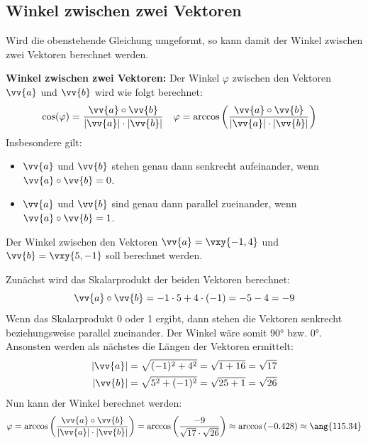 \newpage
\subsection{Winkel zwischen zwei Vektoren}
Wird die obenstehende Gleichung umgeformt, so kann damit der Winkel zwischen
zwei Vektoren berechnet werden.
\begin{theorem}
  \textbf{Winkel zwischen zwei Vektoren:} Der Winkel $\varphi$ zwischen den
  Vektoren $\vv{a}$ und $\vv{b}$ wird
  wie folgt berechnet:
  \begin{align*}
    \cos(\varphi) &= \frac{\vv{a}\circ \vv{b}}{|\vv{a}|\cdot |\vv{b}|} &
    \varphi &= \arccos\left(\frac{\vv{a}\circ \vv{b}}{|\vv{a}|\cdot |\vv{b}|}\right)
  \end{align*}
  Insbesondere gilt:
  \begin{itemize}
    \item $\vv{a}$ und $\vv{b}$ stehen genau dann senkrecht aufeinander, wenn $\vv{a}\circ \vv{b} = 0$.
    \item $\vv{a}$ und $\vv{b}$ sind genau dann parallel zueinander, wenn $\vv{a}\circ \vv{b} = 1$.
  \end{itemize}
\end{theorem}

\begin{example}
  Der Winkel zwischen den Vektoren $\vv{a} = \vxy{-1,4}$ und $\vv{b} = \vxy{5,-1}$ soll berechnet werden.

  Zunächst wird das Skalarprodukt der beiden Vektoren berechnet:
  \[
    \vv{a}\circ \vv{b} = -1\cdot 5+4\cdot (-1) = -5-4 = -9
  \]
  Wenn das Skalarprodukt 0 oder 1 ergibt, dann stehen die Vektoren senkrecht beziehungsweise
  parallel zueinander. Der Winkel wäre somit \ang{90} bzw. \ang{0}. Ansonsten werden als
  nächstes die Längen der Vektoren ermittelt:
  \begin{align*}
    |\vv{a}| &= \sqrt{(-1)^{2}+4^{2}} = \sqrt{1+16} = \sqrt{17} \\
    |\vv{b}| &= \sqrt{5^{2}+(-1)^{2}} = \sqrt{25+1} = \sqrt{26}
  \end{align*}
  Nun kann der Winkel berechnet werden:
  \[
    \varphi = \arccos\left(\frac{\vv{a}\circ \vv{b}}{|\vv{a}|\cdot |\vv{b}|}\right)
    = \arccos\left(\frac{-9}{\sqrt{17}\cdot \sqrt{26}}\right) \approx \arccos\left(-0.428\right) \approx \ang{115.34}
  \]
\end{example}

